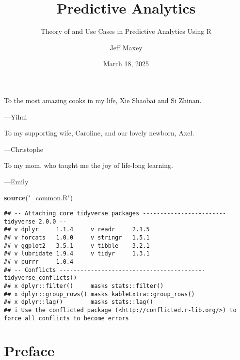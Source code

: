 \documentclass[
  12pt,
]{krantz}
\title{Predictive Analytics}
\subtitle{Theory of and Use Cases in Predictive Analytics Using R}
\author{Jeff Maxey}
\date{March 18, 2025}
\newenvironment{Shaded}{\begin{snugshade}}{\end{snugshade}}
\newcommand{\FunctionTok}[1]{\textcolor[rgb]{0.27,0.27,0.27}{\textbf{#1}}}
\newcommand{\NormalTok}[1]{#1}
\newcommand{\StringTok}[1]{\textcolor[rgb]{0.5,0.5,0.5}{#1}}
\begin{document}
\maketitle

\cleardoublepage\newpage\thispagestyle{empty}\null
\cleardoublepage\newpage\thispagestyle{empty}\null
\thispagestyle{empty}
\begin{large}
To the most amazing cooks in my life, Xie Shaobai and Si Zhinan.
\begin{flushright}
---Yihui
\end{flushright}

\bigskip

To my supporting wife, Caroline, and our lovely newborn, Axel.
\begin{flushright}
---Christophe
\end{flushright}

\bigskip

To my mom, who taught me the joy of life-long learning.
\begin{flushright}
---Emily
\end{flushright}
\end{large}

\setlength{\abovedisplayskip}{-5pt}
\setlength{\abovedisplayshortskip}{-5pt}

{
\hypersetup{linkcolor=}
\setcounter{tocdepth}{2}
\tableofcontents
}
\listoffigures
\listoftables
\begin{Shaded}
\begin{Highlighting}[]
\FunctionTok{source}\NormalTok{(}\StringTok{"\_common.R"}\NormalTok{)}
\end{Highlighting}
\end{Shaded}

\begin{verbatim}
## -- Attaching core tidyverse packages ------------------------ tidyverse 2.0.0 --
## v dplyr     1.1.4     v readr     2.1.5
## v forcats   1.0.0     v stringr   1.5.1
## v ggplot2   3.5.1     v tibble    3.2.1
## v lubridate 1.9.4     v tidyr     1.3.1
## v purrr     1.0.4     
## -- Conflicts ------------------------------------------ tidyverse_conflicts() --
## x dplyr::filter()     masks stats::filter()
## x dplyr::group_rows() masks kableExtra::group_rows()
## x dplyr::lag()        masks stats::lag()
## i Use the conflicted package (<http://conflicted.r-lib.org/>) to force all conflicts to become errors
\end{verbatim}

\chapter*{Preface}\label{preface}
\end{document}
